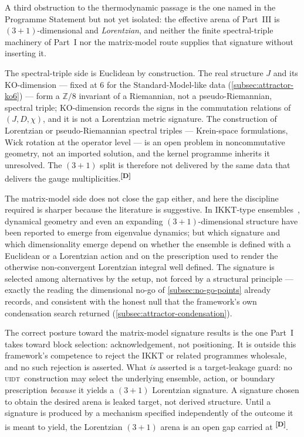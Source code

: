 \documentclass[12pt,a4paper,twoside]{article}
\theoremstyle{plain}
\theoremstyle{definition}
\theoremstyle{remark}
\newcommand{\UIDT}{\textsc{uidt}}
\newcommand{\catmark}[1]{\textsuperscript{\textsf{\textbf{[#1]}}}}
\begin{document}
A third obstruction to the thermodynamic passage is the one named in the
Programme Statement but not yet isolated: the effective arena of Part~III
is $(3{+}1)$-dimensional and \emph{Lorentzian}, and neither the finite
spectral-triple machinery of Part~I nor the matrix-model route supplies
that signature without inserting it.

The spectral-triple side is Euclidean by construction. The real structure
$J$ and its $\mathrm{KO}$-dimension --- fixed at $6$ for the
Standard-Model-like data (\cref{subsec:attractor-ko6}) --- form a
$\mathbb Z/8$ invariant of a Riemannian, not a pseudo-Riemannian, spectral
triple; $\mathrm{KO}$-dimension records the signs in the commutation
relations of $(J, D, \chi)$, and it is not a Lorentzian metric signature.
The construction of Lorentzian or pseudo-Riemannian spectral triples ---
Krein-space formulations, Wick rotation at the operator level --- is an
open problem in noncommutative geometry, not an imported solution, and the
kernel programme inherits it unresolved. The $(3{+}1)$ split is therefore
not delivered by the same data that delivers the gauge
multiplicities.\catmark{D}

The matrix-model side does not close the gap either, and here the
discipline required is sharper because the literature is suggestive. In
IKKT-type ensembles~\cite{ikkt1997,steinacker2010}, dynamical geometry and
even an expanding $(3{+}1)$-dimensional structure have been reported to
emerge from eigenvalue dynamics; but which signature and which
dimensionality emerge depend on whether the ensemble is defined with a
Euclidean or a Lorentzian action and on the prescription used to render
the otherwise non-convergent Lorentzian integral well defined. The
signature is selected among alternatives by the setup, not forced by a
structural principle --- exactly the reading the dimensional no-go of
\cref{subsec:no-go-points} already records, and consistent with the honest
null that the framework's own condensation search returned
(\cref{subsec:attractor-condensation}).

\begin{governancebox}
The correct posture toward the matrix-model signature results is the one
Part~I takes toward block selection: acknowledgement, not positioning. It
is outside this framework's competence to reject the IKKT or related
programmes wholesale, and no such rejection is asserted. What \emph{is}
asserted is a target-leakage guard: no \UIDT\ construction may select the
underlying ensemble, action, or boundary prescription \emph{because} it
yields a $(3{+}1)$ Lorentzian signature. A signature chosen to obtain the
desired arena is leaked target, not derived structure. Until a signature is
produced by a mechanism specified independently of the outcome it is meant
to yield, the Lorentzian $(3{+}1)$ arena is an open gap carried at
\catmark{D}.
\end{governancebox}
\end{document}
